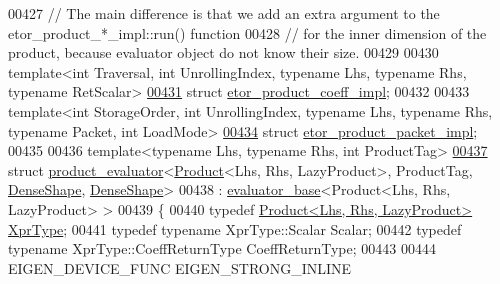\begin{DoxyCode}
00427 \textcolor{comment}{// The main difference is that we add an extra argument to the etor\_product\_*\_impl::run() function}
00428 \textcolor{comment}{// for the inner dimension of the product, because evaluator object do not know their size.}
00429 
00430 \textcolor{keyword}{template}<\textcolor{keywordtype}{int} Traversal, \textcolor{keywordtype}{int} UnrollingIndex, \textcolor{keyword}{typename} Lhs, \textcolor{keyword}{typename} Rhs, \textcolor{keyword}{typename} RetScalar>
\hyperlink{struct_eigen_1_1internal_1_1etor__product__coeff__impl}{00431} \textcolor{keyword}{struct }\hyperlink{struct_eigen_1_1internal_1_1etor__product__coeff__impl}{etor\_product\_coeff\_impl};
00432 
00433 \textcolor{keyword}{template}<\textcolor{keywordtype}{int} StorageOrder, \textcolor{keywordtype}{int} UnrollingIndex, \textcolor{keyword}{typename} Lhs, \textcolor{keyword}{typename} Rhs, \textcolor{keyword}{typename} Packet, \textcolor{keywordtype}{int} LoadMode>
\hyperlink{struct_eigen_1_1internal_1_1etor__product__packet__impl}{00434} \textcolor{keyword}{struct }\hyperlink{struct_eigen_1_1internal_1_1etor__product__packet__impl}{etor\_product\_packet\_impl};
00435 
00436 \textcolor{keyword}{template}<\textcolor{keyword}{typename} Lhs, \textcolor{keyword}{typename} Rhs, \textcolor{keywordtype}{int} ProductTag>
\hyperlink{struct_eigen_1_1internal_1_1product__evaluator_3_01_product_3_01_lhs_00_01_rhs_00_01_lazy_produc1ed1c0c8715953d10d735722e273406b}{00437} \textcolor{keyword}{struct }\hyperlink{struct_eigen_1_1internal_1_1product__evaluator}{product\_evaluator}<\hyperlink{group___core___module_class_eigen_1_1_product}{Product}<Lhs, Rhs, LazyProduct>, ProductTag, 
      \hyperlink{struct_eigen_1_1_dense_shape}{DenseShape}, \hyperlink{struct_eigen_1_1_dense_shape}{DenseShape}>
00438     : \hyperlink{struct_eigen_1_1internal_1_1evaluator__base}{evaluator\_base}<Product<Lhs, Rhs, LazyProduct> >
00439 \{
00440   \textcolor{keyword}{typedef} \hyperlink{group___core___module_class_eigen_1_1_product}{Product<Lhs, Rhs, LazyProduct>} \hyperlink{group___core___module_class_eigen_1_1_product}{XprType};
00441   \textcolor{keyword}{typedef} \textcolor{keyword}{typename} XprType::Scalar Scalar;
00442   \textcolor{keyword}{typedef} \textcolor{keyword}{typename} XprType::CoeffReturnType CoeffReturnType;
00443 
00444   EIGEN\_DEVICE\_FUNC EIGEN\_STRONG\_INLINE

\end{DoxyCode}
